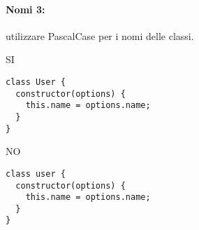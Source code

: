 \documentclass[../ProcessiPrimari.tex]{subfiles}
\begin{document}
\paragraph{Nomi 3:}utilizzare PascalCase per i nomi delle classi.
\begin{center}{
		\begin{minipage}{6.5cm}
			{\begin{center}SI\end{center}}
			\begin{Verbatim}[frame=single]
class User {
  constructor(options) {
    this.name = options.name;
  }
}
			\end{Verbatim}
		\end{minipage}
		\hfil
		\begin{minipage}{6.5cm}
			{\begin{center}NO\end{center}}
			\begin{Verbatim}[frame=single]
class user {
  constructor(options) {
    this.name = options.name;
  }
}
			\end{Verbatim}
		\end{minipage}
	}
\end{center}
\end{document}
